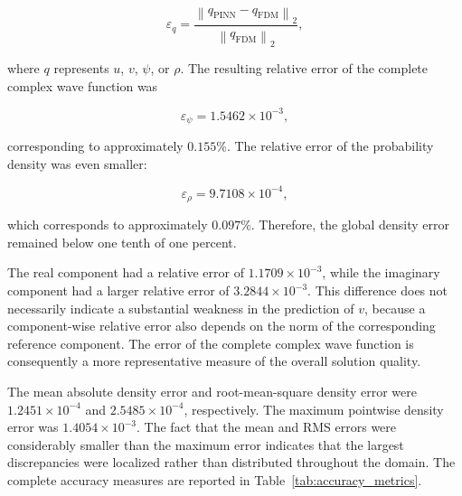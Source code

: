 \documentclass[11pt]{article}
\begin{document}
\begin{equation}
\varepsilon_q
=
\frac{
\left\|
q_{\mathrm{PINN}}-q_{\mathrm{FDM}}
\right\|_2
}{
\left\|
q_{\mathrm{FDM}}
\right\|_2
},
\end{equation}

where \(q\) represents \(u\), \(v\), \(\psi\), or \(\rho\). The resulting relative error of the complete complex wave function was

\begin{equation}
\varepsilon_{\psi}
=
1.5462\times10^{-3},
\end{equation}

corresponding to approximately \(0.155\%\). The relative error of the probability density was even smaller:

\begin{equation}
\varepsilon_{\rho}
=
9.7108\times10^{-4},
\end{equation}

which corresponds to approximately \(0.097\%\). Therefore, the global density error remained below one tenth of one percent.

The real component had a relative error of \(1.1709\times10^{-3}\), while the imaginary component had a 
larger relative error of \(3.2844\times10^{-3}\). This difference does not necessarily 
indicate a substantial weakness in the prediction of \(v\), because a component-wise 
relative error also depends on the norm of the corresponding reference component. 
The error of the complete complex wave function is consequently a more representative 
measure of the overall solution quality.

The mean absolute density error and 
root-mean-square density error were \(1.2451\times10^{-4}\) and \(2.5485\times10^{-4}\), 
respectively. The maximum pointwise density error was \(1.4054\times10^{-3}\). The fact 
that the mean and RMS errors were considerably smaller than the maximum error indicates that the 
largest discrepancies were localized rather than distributed throughout the domain. The complete 
accuracy measures are reported in Table~\ref{tab:accuracy_metrics}.
\end{document}

